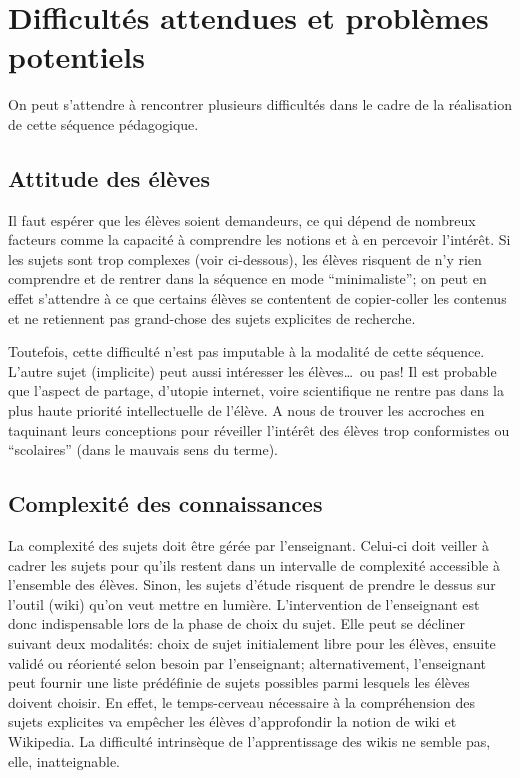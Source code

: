 \documentclass[11pt,bibliography=totoc]{scrartcl}
\newcommand\rajout[1]{{\color{green} #1}}
\begin{document}
\section{Difficultés attendues et problèmes potentiels}
On peut s'attendre à rencontrer plusieurs difficultés dans le cadre de la
réalisation de cette séquence pédagogique.

\subsection{Attitude des élèves}
Il faut espérer que les élèves soient demandeurs, ce qui dépend de nombreux
facteurs comme la capacité à comprendre les notions et à en percevoir
l'intérêt. Si les sujets sont trop complexes (voir ci-dessous), les élèves
risquent de n'y rien comprendre et de rentrer dans la séquence en mode
``minimaliste''; on peut en effet s'attendre à ce que certains élèves se
contentent de copier-coller les contenus et ne retiennent pas grand-chose des
sujets explicites de recherche.

Toutefois, cette difficulté n'est pas imputable à la modalité de cette séquence.
L'autre sujet (implicite) peut aussi intéresser les élèves\ldots\ ou pas! Il est
probable que l'aspect de partage, d'utopie internet, voire scientifique ne
rentre pas dans la plus haute priorité intellectuelle de l'élève. A nous de
trouver les accroches en taquinant leurs conceptions pour réveiller l'intérêt
des élèves trop conformistes ou ``scolaires'' (dans le mauvais sens du terme).

\subsection{Complexité des connaissances}
La complexité des sujets doit être gérée par l'enseignant. Celui-ci doit veiller
à cadrer les sujets pour qu'ils restent dans un intervalle de complexité
accessible à l'ensemble des élèves. Sinon, les sujets d'étude risquent de
prendre le dessus sur l'outil (wiki) qu'on veut mettre en lumière.
\rajout{L'intervention de l'enseignant est donc indispensable lors de la phase
  de choix du sujet. Elle peut se décliner suivant deux modalités: choix de
  sujet initialement libre pour les élèves, ensuite validé ou réorienté selon
  besoin par l'enseignant; alternativement, l'enseignant peut fournir une liste
  prédéfinie de sujets possibles parmi lesquels les élèves doivent choisir.} En
effet, le temps-cerveau nécessaire à la compréhension des sujets explicites va
empêcher les élèves d'approfondir la notion de wiki et Wikipedia.  La difficulté
intrinsèque de l'apprentissage des wikis ne semble pas, elle, inatteignable.
\end{document}
